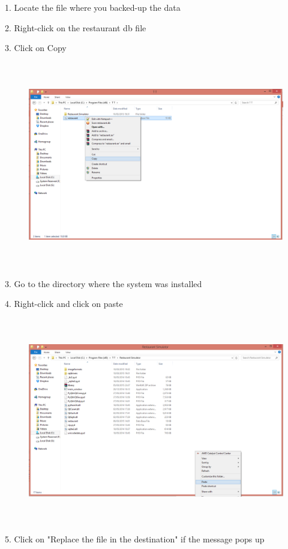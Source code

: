 1. Locate the file where you backed-up the data

2. Right-click on the restaurant db file

3. Click on Copy

\begin{figure}[H]
    \includegraphics[height = 9cm]{./Manual/images/restore} 
    \caption{} \label{fig:hamerraor3}
\end{figure}

3. Go to the directory where the system was installed

4. Right-click and click on paste

\begin{figure}[H]
    \includegraphics[height = 9cm]{./Manual/images/restore2} 
    \caption{} \label{fig:hamerfaraor3}
\end{figure}

5. Click on "Replace the file in the destination" if the message pops up

